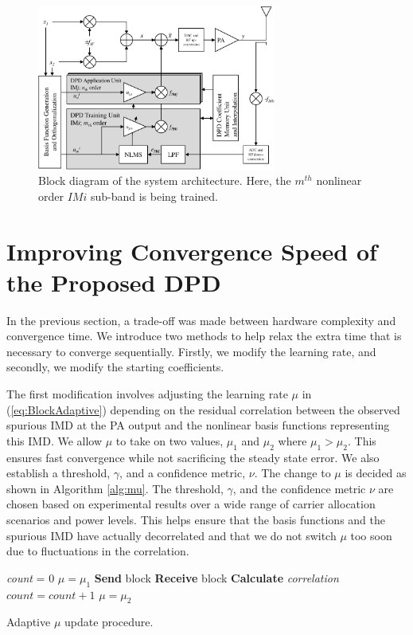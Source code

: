 \begin{figure}[]
	\centering
	\includegraphics[width=0.7\textwidth]{blockdiagram}
	\caption{Block diagram of the system architecture. Here, the $m^{th}$ nonlinear order $IMi$ sub-band is being trained.}
	\label{fig:blockdiagram}
\end{figure}
\section{Improving Convergence Speed of the Proposed DPD}
\label{sec:ConvergenceSpeed}
In the previous section, a trade-off was made between hardware complexity and convergence time. We introduce two methods to help relax the extra time that is necessary to converge sequentially. 
Firstly, we modify the learning rate, and secondly, we modify the starting coefficients.

The first modification involves adjusting the learning rate $\mu$ in (\ref{eq:BlockAdaptive}) depending on the residual correlation between the observed spurious IMD at the PA output and the nonlinear basis functions representing this IMD.
We allow $\mu$ to take on two values, $\mu_1$ and $\mu_2$ where $\mu_1 > \mu_2$. 
This ensures fast convergence while not sacrificing the steady state error. 
We also establish a threshold, $\gamma$, and a confidence metric, $\nu$. 
The change to $\mu$ is decided as shown in Algorithm \ref{alg:mu}.
The threshold, $\gamma$, and the confidence metric $\nu$ are chosen based on experimental results over a wide range of carrier allocation scenarios and power levels. 
This helps ensure that the basis functions and the spurious IMD have actually decorrelated and that we do not switch $\mu$ too soon due to fluctuations in the correlation.
\begin{algorithm}[h]
	\SetAlgoLined
	\textit{count} = 0\;
	$\mu = \mu_1$\;
	{
		\textbf{Send} block\;
		\textbf{Receive} block\;
		\textbf{Calculate} \textit{correlation}\;
		{
			$count = count + 1$\; 
		}
		{
			$\mu = \mu_2$\; 
		}
	}
	\caption{Adaptive $\mu$ update procedure.}
	\label{alg:mu}
\end{algorithm}


